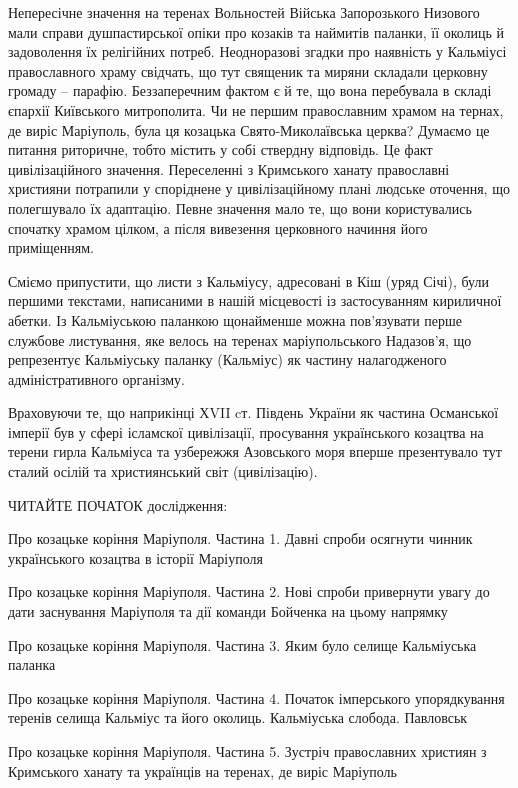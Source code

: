 Непересічне значення на теренах Вольностей Війська Запорозького Низового мали
справи душпастирської опіки про козаків та наймитів паланки, її околиць й
задоволення їх релігійних потреб.  Неодноразові згадки про наявність у
Кальміусі православного храму свідчать, що тут священик та миряни складали
церковну громаду – парафію. Беззаперечним фактом є й те, що вона перебувала в
складі єпархії Київського митрополита. Чи не першим православним храмом на
тернах, де  виріс Маріуполь, була ця козацька Свято-Миколаївська церква?
Думаємо це питання риторичне, тобто містить у собі ствердну відповідь. Це факт
цивілізаційного значення. Переселенні з Кримського ханату православні християни
потрапили у споріднене у цивілізаційному плані людське оточення, що полегшувало
їх адаптацію. Певне значення мало те, що вони користувались спочатку храмом
цілком, а після вивезення церковного начиння його приміщенням.

Сміємо припустити, що листи з Кальміусу, адресовані в Кіш (уряд Січі), були
першими текстами, написаними  в нашій місцевості із застосуванням кириличної
абетки. Із Кальміуською паланкою щонайменше можна пов’язувати перше службове
листування, яке велось на теренах маріупольського Надазов’я, що репрезентує
Кальміуську паланку (Кальміус) як частину налагодженого адміністративного
організму. 

Враховуючи те, що наприкінці ХVII cт. Південь України як частина Османської
імперії був у сфері ісламскої цивілізації, просування українського козацтва на
терени гирла Кальміуса та узбережжя Азовського моря вперше презентувало тут
сталий осілій та християнський світ (цивілізацію).

ЧИТАЙТЕ ПОЧАТОК дослідження: 

Про козацьке коріння Маріуполя. Частина 1. Давні спроби осягнути чинник
українського козацтва в історії Маріуполя

Про козацьке коріння Маріуполя. Частина 2. Нові спроби привернути увагу до дати
заснування Маріуполя та дії команди Бойченка на цьому напрямку

Про козацьке коріння Маріуполя. Частина 3. Яким було селище Кальміуська паланка

Про козацьке коріння Маріуполя. Частина 4. Початок імперського упорядкування
теренів селища Кальміус та його околиць. Кальміуська слобода. Павловськ

Про козацьке коріння Маріуполя. Частина 5. Зустріч православних християн з
Кримського ханату та українців на теренах, де виріс Маріуполь
